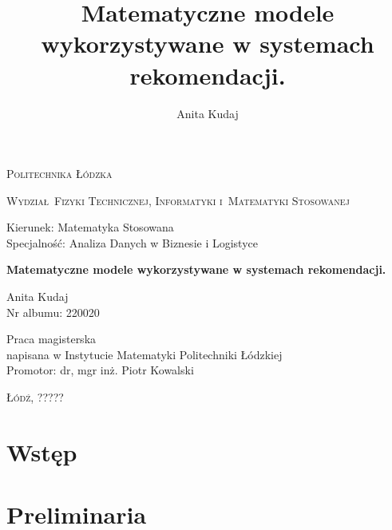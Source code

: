 \documentclass[12pt,a4paper]{report}
\author{Anita Kudaj}
\title{Matematyczne modele wykorzystywane w systemach rekomendacji.}
\begin{document}
\begin{titlepage}
\begin{flushleft}
\end{flushleft}
\begin{center}
\textsc{{\huge Politechnika \L\'odzka}}
\end{center}
\bigskip
\bigskip
\begin{center}
\textsc{{\Large Wydzia\l\ Fizyki Technicznej, Informatyki i~Matematyki Stosowanej}}
\end{center}
\bigskip
\bigskip
\begin{Large}
Kierunek: Matematyka Stosowana\\
Specjalno\'s\'c: Analiza Danych w Biznesie i Logistyce
\\
\end{Large}
\bigskip
\bigskip
\noindent\hrulefill
\begin{center}
{\textbf{{\Large Matematyczne modele wykorzystywane w systemach rekomendacji.}}}
\end{center}
\begin{flushright}
{\large 
Anita Kudaj
\\
Nr albumu: 
220020
\\}
\end{flushright}
\noindent\hrulefill
\bigskip
\bigskip
\begin{center}
{\large Praca magisterska
\\napisana w Instytucie Matematyki Politechniki Łódzkiej\\ 
\bigskip
\bigskip
\bigskip
\bigskip
Promotor: dr, mgr inż. Piotr Kowalski
 }
\end{center}
\bigskip
\bigskip
\bigskip
\bigskip
\begin{center}
{\textsc{\large \L\'od\'z, ?????}}
\end{center}
\end{titlepage}


\tableofcontents

\chapter{Wstęp}
\chapter{Preliminaria} %
\end{document}
